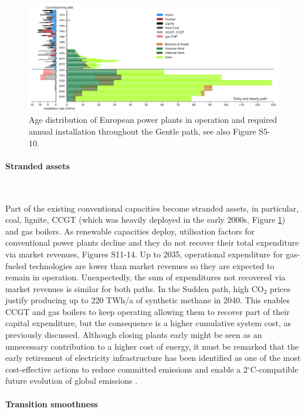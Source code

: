 \documentclass[5p]{elsarticle} %
\begin{document}
\begin{figure}[!h]
\centering
\includegraphics[width=\textwidth]{../figures/age_distribution_Base_Gentle.png}
\caption{Age distribution of European power plants in operation \cite{powerplantmatching, IRENA_2019} and required annual installation throughout the Gentle path, see also Figure S5-10.} \label{fig_age_distribution} 
\end{figure}

\paragraph{\textbf{Stranded assets}} \

Part of the existing conventional capacities become stranded assets, in particular, coal, lignite, CCGT (which was heavily deployed in the early 2000s, Figure \ref{fig_age_distribution}) and gas boilers. As renewable capacities deploy, utilisation factors for conventional power plants decline and they do not recover their total expenditure via market revenues, Figures S11-14. Up to 2035, operational expenditure for gas-fueled technologies are lower than market revenues so they are expected to remain in operation. Unexpectedly, the sum of expenditures not recovered via market revenues is similar for both paths. In the Sudden path, high CO$_2$ prices justify producing up to 220 TWh/a of synthetic methane in 2040. This enables CCGT and gas boilers to keep operating allowing them to recover part of their capital expenditure, but the consequence is a higher cumulative system cost, as previously discussed. Although closing plants early might be seen as an unnecessary contribution to a higher cost of energy, it must be remarked that the early retirement of electricity infrastructure has been identified as one of the most cost-effective actions to reduce committed emissions and enable a 2$^{\circ}$C-compatible future evolution of global emissions \cite{Tong_2019}.


\paragraph{\textbf{Transition smoothness}} \
\end{document}
